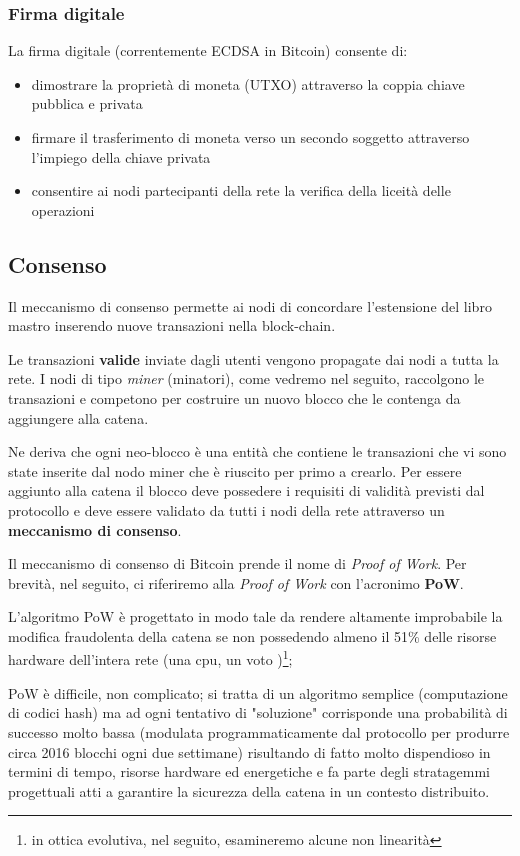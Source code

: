 \documentclass{book}
\theoremstyle{definition}
\begin{document}
\subsubsection{Firma digitale}

La firma digitale (correntemente ECDSA in Bitcoin) consente di:

\begin{itemize}
    \item dimostrare la proprietà di moneta (UTXO) attraverso la coppia chiave pubblica e privata
    \item firmare il trasferimento di moneta verso un secondo soggetto attraverso l'impiego della chiave privata
    \item consentire ai nodi partecipanti della rete la verifica della liceità delle operazioni
\end{itemize}

\subsection{Consenso}

Il meccanismo di consenso permette ai nodi di concordare l'estensione del libro mastro inserendo nuove transazioni nella block-chain.

Le transazioni \textbf{valide} inviate dagli utenti vengono propagate dai nodi a tutta la rete. I nodi di tipo \textit{miner} (minatori), come vedremo nel seguito, raccolgono le transazioni e competono per
costruire un nuovo blocco che le contenga da aggiungere alla catena. 

Ne deriva che ogni neo-blocco è una entità che contiene le transazioni che vi sono state inserite dal nodo miner che è riuscito per primo a crearlo. 
Per essere aggiunto alla catena il blocco deve possedere i requisiti di validità previsti dal protocollo e deve essere validato da tutti i nodi della rete
attraverso un \textbf{meccanismo di consenso}.

Il meccanismo di consenso di Bitcoin prende il nome di \textit{Proof of Work}.
Per brevità, nel seguito, ci riferiremo alla \textit{Proof of Work} con l'acronimo \textbf{PoW}.

L'algoritmo PoW è progettato in modo tale da rendere altamente improbabile la modifica fraudolenta della catena se non possedendo almeno il 51\% delle risorse hardware dell'intera rete (una cpu, un voto \cite{Nakamoto})\footnote{in ottica evolutiva, nel seguito, esamineremo alcune non linearità}; 

PoW è difficile, non complicato; si tratta di un algoritmo semplice (computazione di codici hash) ma ad ogni tentativo di "soluzione" corrisponde una probabilità di successo molto bassa (modulata programmaticamente dal protocollo per produrre circa 2016 blocchi ogni due settimane) risultando di fatto molto dispendioso in termini di tempo, 
risorse hardware ed energetiche e fa parte degli stratagemmi progettuali atti a garantire la sicurezza della catena in un contesto distribuito.
\end{document}
